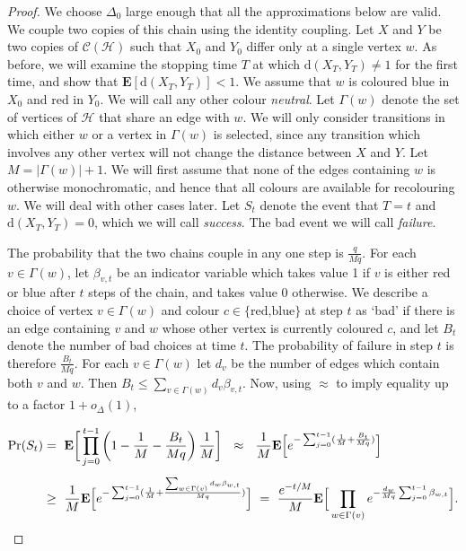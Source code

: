 \documentclass[11pt]{article}
\theoremstyle{definition}
\theoremstyle{remark}
\newcommand{\e}{\mathbf{E}}
\newcommand{\C}{\mathcal{C}}
\newcommand{\CH}{\mathcal{H}}
\begin{document}
\begin{proof}
We choose $\Delta_0$ large enough that all the approximations below are
valid. We couple two copies of this chain using the identity coupling. Let
$X$ and $Y$ be two copies of $\C(\CH)$ such that $X_0$ and $Y_0$ differ
only at a single vertex $w$. As before, we will examine the stopping time
$T$ at which $\mathrm{d}(X_T,Y_T)\neq 1$ for the first time, and show that
$\e[\mathrm{d}(X_T,Y_T)]< 1$. We assume that $w$ is coloured blue in $X_0$
and red in $Y_0$. We will call any other colour \emph{neutral}. Let
$\Gamma(w)$ denote the set of vertices of $\CH$ that share an edge with
$w$. We will only consider transitions in which either $w$ or a vertex in
$\Gamma(w)$ is selected, since any transition which involves any other
vertex will not change the distance between $X$ and $Y$. Let
$M=|\Gamma(w)|+1$. We will first assume that none of the edges containing
$w$ is otherwise monochromatic, and hence that all colours are available
for recolouring $w$. We will deal with other cases later. Let $S_t$ denote
the event that $T=t$ and $\mathrm{d}(X_T,Y_T)=0$, which we will call
\emph{success}. The bad event we will call \emph{failure}.

The probability that the two chains couple in any one step is
$\frac{q}{Mq}$. For each $v\in \Gamma(w)$, let $\beta_{v,t}$ be an
indicator variable which takes value 1 if $v$ is either red or blue after
$t$ steps of the chain, and takes value 0 otherwise. We describe a choice
of vertex $v\in\Gamma(w)$ and colour $c\in \{\textrm{red,blue}\}$ at step
$t$ as `bad' if there is an edge containing $v$ and $w$ whose other vertex
is currently coloured $c$, and let $B_t$ denote the number of bad choices
at time $t$. The probability of failure in step $t$ is therefore
$\frac{B_t}{Mq}$. For each $v\in \Gamma(w)$ let $d_v$ be the number of
edges which contain both $v$ and $w$. Then $B_t\leq \sum_{v\in\Gamma(w)}
d_v\beta_{v,t}$.  Now, using $\approx$ to imply equality up to a factor
$1+o_\Delta(1)$,

\begin{align}
 \Pr(S_t)&=\ \e\bigg[\prod_{j=0}^{t-1}\left(1-\frac{1}{M}-\frac{B_t}{Mq}\right)
 \frac{1}{M}\bigg]\ \
 \approx\  \ \frac{1}{M}\e\Big[e^{-\sum_{j=0}^{t-1}(\frac{1}{M}+\frac{B_t}{Mq})}\Big]\notag\\[1ex]
& \geq\ \frac{1}{M}\e\Big[e^{-\sum_{j=0}^{t-1}(\frac{1}{M}+\frac{\sum_{w\in\Gamma(v)}
 d_w\beta_{w,t}}{Mq})}\Big]\
 =\ \frac{e^{-t/M}}{M}\e\Big[\prod_{w\in\Gamma(v)}e^{- \frac{
d_w}{Mq}\sum_{j=0}^{t-1}\beta_{w,t}}\Big].\label{prs}
\end{align}


\end{proof}
\end{document}
